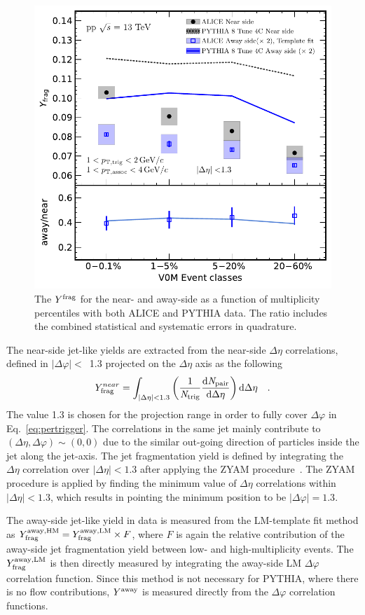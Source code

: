 \begin{figure}[h!]
	\centering
	\includegraphics[width=0.6 \textwidth]{figures/Fig5_Plot_v2Mult.pdf} 
	\caption{The $Y^{\rm{frag}}$ for the near- and away-side as a function of multiplicity percentiles with both ALICE and PYTHIA data. The ratio includes the combined statistical and systematic errors in quadrature.}
	\label{fig:Ymult}
\end{figure}

The near-side jet-like yields are extracted from the near-side $\Delta\eta$ correlations, defined in $|\Delta\varphi|<$~1.3 projected on the $\Delta\eta$ axis as the following
\begin{eqnarray}
Y^{near}_{\rm{frag}} = \int_{|\Delta \eta|<1.3} \left( \frac{1}{\it{N}_{\rm{trig}}} \frac{ \rm{d}\it{}N_{\rm{pair}} }{ \rm{d}\Delta\eta } \right) \rm{d} \Delta\eta \quad.
\label{eq:Ynear}
\end{eqnarray}
The value 1.3 is chosen for the projection range in order to fully cover $\Delta\varphi$ in Eq.~\ref{eq:pertrigger}. The correlations in the same jet mainly contribute to $(\Delta\eta, \Delta\varphi) \sim (0,0)$ due to the similar out-going direction of particles inside the jet along the jet-axis. The jet fragmentation yield is defined by integrating the $\Delta\eta$ correlation over $|\Delta\eta|<1.3$ after applying the ZYAM procedure~\cite{Ajitanand:2005jj}. The ZYAM procedure is applied by finding the minimum value of $\Delta\eta$ correlations within $|\Delta\eta|<1.3$, which results in pointing the minimum position to be $|\Delta\varphi|=1.3$.

The away-side jet-like yield in data is measured from the LM-template fit method as $Y^{\rm{away, HM}}_{\mathrm{frag}} = Y^{\rm{away, LM}}_{\mathrm{frag}} \times F$, where $F$ is again the relative contribution of the away-side jet fragmentation yield between low- and high-multiplicity events. The $Y^{\rm{away, LM}}_{\mathrm{frag}}$ is then directly measured by integrating the away-side LM $\Delta\varphi$ correlation function. Since this method is not necessary for PYTHIA, where there is no flow contributions, $Y^{\rm{away}}$ is measured directly from the $\Delta\varphi$ correlation functions.

